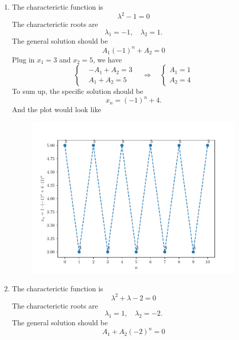 \begin{homeworkProblem}
\begin{enumerate}
        \item The characterictic function is \[
            \lambda^2 - 1 = 0
        \]
        The characterictic roots are \[
            \lambda_1 = -1, \quad \lambda_2 = 1.
        \]
        The general solution should be \[
            A_1 (-1)^n + A_2  = 0
        \]
        Plug in $x_1 = 3$ and $x_2 = 5$, we have \[
            \left\{
            \begin{aligned}
                &-A_1 + A_2  = 3\\
                &A_1  + A_2 = 5
            \end{aligned}
            \right.
            \quad
            \Rightarrow
            \quad
            \left\{
            \begin{aligned}
                A_1 = 1\\
                A_2 = 4
            \end{aligned}
            \right.
        \]
        To sum up, the specific solution should be $$
            x_n = (-1)^n + 4.
        $$
        And the plot would look like
        \begin{figure}[H]
            \centering
            \includegraphics[scale=0.5]{fig/fig2(c).pdf}
        \end{figure}
        \addtocounter{enumi}{1}
    \pagebreak
        \item The characterictic function is \[
            \lambda^2 + \lambda -2 = 0
        \]
        The characterictic roots are \[
            \lambda_1 = 1, \quad \lambda_2 = -2.
        \]
        The general solution should be \[
            A_1 + A_2 (-2)^n = 0
\]
\end{enumerate}
\end{homeworkProblem}
